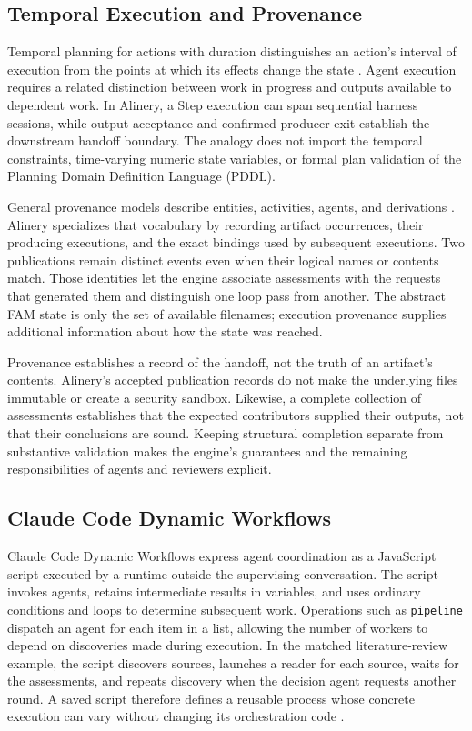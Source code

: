 \documentclass[letterpaper]{article}
\theoremstyle{definition}
\begin{document}
\subsection{Temporal Execution and Provenance}

Temporal planning for actions with duration distinguishes an action's interval
of execution from the points at which its effects change the state
\cite{fox2003pddl21}. Agent execution requires a related distinction between
work in progress and outputs available to dependent work. In Alinery, a Step
execution can span sequential harness sessions, while output acceptance and
confirmed producer exit establish the downstream handoff boundary. The
analogy does not import the temporal constraints, time-varying numeric state
variables, or formal plan validation of the Planning Domain Definition
Language (PDDL).

General provenance models describe entities, activities, agents, and
derivations \cite{moreau2013prov}. Alinery specializes that vocabulary by
recording artifact occurrences, their producing executions, and the exact
bindings used by subsequent executions. Two publications remain distinct
events even when their logical names or contents match. Those identities let
the engine associate assessments with the requests that generated them and
distinguish one loop pass from another. The abstract FAM state is only the set
of available filenames; execution provenance supplies additional information
about how the state was reached.

Provenance establishes a record of the handoff, not the truth of an artifact's
contents. Alinery's accepted publication records do not make the underlying
files immutable or create a security sandbox. Likewise, a complete collection
of assessments establishes that the expected contributors supplied their
outputs, not that their conclusions are sound. Keeping structural completion
separate from substantive validation makes the engine's guarantees and the
remaining responsibilities of agents and reviewers explicit.

\subsection{Claude Code Dynamic Workflows}

Claude Code Dynamic Workflows express agent coordination as a JavaScript
script executed by a runtime outside the supervising conversation. The script
invokes agents, retains intermediate results in variables, and uses ordinary
conditions and loops to determine subsequent work. Operations such as
\texttt{pipeline} dispatch an agent for each item in a list, allowing the number
of workers to depend on discoveries made during execution. In the matched
literature-review example, the script discovers sources, launches a reader for
each source, waits for the assessments, and repeats discovery when the decision
agent requests another round. A saved script therefore defines a reusable
process whose concrete execution can vary without changing its orchestration
code \cite{anthropic2026dynamicworkflows}.
\end{document}
